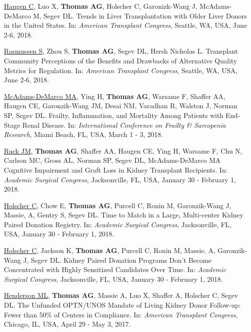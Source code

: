 \documentclass[10pt]{article}
\makeatletter
\newlength{\bibhang}
\newlength{\bibsep}
 {\@listi \global\bibsep\itemsep \global\advance\bibsep by\parsep}
\newenvironment{bibenum*}
  {\renewcommand\labelenumi{[\theenumi]}%
   \etaremune[
     topsep=0pt,
     itemsep=\bibsep,
     parsep=0pt,partopsep=0pt,
     itemindent=-\bibhang,
     leftmargin={\bibhang+\widthof{[999]}}]}
  {\endetaremune}
\makeatother
\begin{document}
\begin{bibenum*}
\item \underline{Haugen C}, Luo X, \textbf{Thomas AG}, Holscher C,
  Garonizk-Wang J, McAdams-DeMarco M, Segev DL.
  Trends in Liver Transplantation with Older Liver
  Donors in the United States.
  In: \emph{American Transplant Congress},
  Seattle, WA, USA, June 2-6, 2018.

\item \underline{Rasmussen S}, Zhou S, \textbf{Thomas AG},
  Segev DL, Hersh Nicholas L. Transplant Community Perceptions
  of the Benefits and Drawbacks of Alternative Quality Metrics
  for Regulation.
  In: \emph{American Transplant Congress},
  Seattle, WA, USA, June 2-6, 2018.

\item \underline{McAdams-DeMarco MA}, Ying H, \textbf{Thomas AG},
  Warsame F, Shaffer AA, Haugen CE, Garonzik-Wang JM, Desai NM,
  Varadhan R, Walston J, Norman SP, Segev DL.
  Frailty, Inflammation, and Mortality Among
  Patients with End-Stage Renal Disease.
  In: \emph{International Conference on Frailty \& Sarcopenia Research},
  Miami Beach, FL, USA, March 1 - 3, 2018.

\item \underline{Ruck JM\dag}, \textbf{Thomas AG\dag}, Shaffer AA,
  Haugen CE, Ying H, Warsame F, Chu N, Carlson MC, Gross AL,
  Norman SP, Segev DL, McAdams-DeMarco MA
  Cognitive Impairment and Graft Loss
  in Kidney Transplant Recipients.
  In: \emph{Academic Surgical Congress},
  Jacksonville, FL, USA, January 30 - February 1, 2018.

\item \underline{Holscher C}, Chow E, \textbf{Thomas AG}, Purcell C,
  Ronin M, Garonzik-Wang J, Massie, A, Gentry S, Segev DL.
  Time to Match in a Large, Multi-center
  Kidney Paired Donation Registry.
  In: \emph{Academic Surgical Congress},
  Jacksonville, FL, USA, January 30 - February 1, 2018.

\item \underline{Holscher C}, Jackson K, \textbf{Thomas AG}, Purcell C,
  Ronin M, Massie, A, Garonzik-Wang J, Segev DL.
  Kidney Paired Donation Programs Don't Become Concentrated
  with Highly Sensitized Candidates Over Time.
  In: \emph{Academic Surgical Congress},
  Jacksonville, FL, USA, January 30 - February 1, 2018.

\item \underline{Henderson ML\dag}, \textbf{Thomas AG\dag}, Massie A,
  Luo X, Shaffer A, Holscher C, Segev DL.
  The Unfunded OPTN/UNOS Mandate of Living Kidney Donor Follow-up:
  Fewer than 50\% of Centers in Compliance.
  In: \emph{American Transplant Congress},
  Chicago, IL, USA, April 29 - May 3, 2017.

\end{bibenum*}
\end{document}
